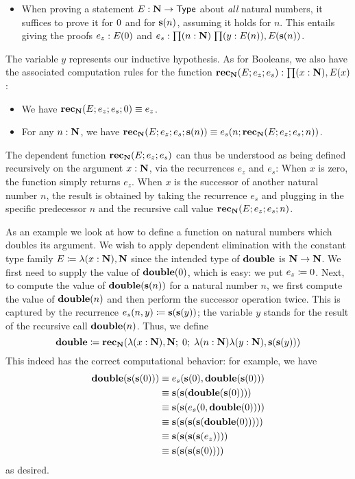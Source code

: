\begin{itemize}
\item When proving a statement $E : \mathbf{N} \to \mathsf{Type}$ about \emph{all} natural numbers, it suffices to prove it for $0$ and for $\mathbf{s}(n)$, assuming it holds
for $n$. This entails giving the proofs $e_z : E(0)$ and $e_s : \prd{n : \nat}{y : E(n)} E(\s(n))$.
\end{itemize}
The variable $y$ represents our inductive hypothesis. As for Booleans, we also have the associated computation rules for the function $\rec_\nat(E;e_z;e_s) : \prd{x:\nat} E(x)$:
\begin{itemize}
\item We have $\mathbf{rec}_\mathbf{N}(E;e_z;e_s;0) \equiv e_z$.
\item For any $n : \mathbf{N}$, we have $\mathbf{rec}_\mathbf{N}(E;e_z;e_s;\mathbf{s}(n)) \equiv e_s(n;\mathbf{rec}_\mathbf{N}(E;e_z;e_s;n))$.
\end{itemize}
The dependent function $\mathbf{rec}_\mathbf{N}(E;e_z;e_s)$ can thus be understood as being defined recursively on the argument $x : \mathbf{N}$, via the recurrences $e_z$ and $e_s$: When $x$ is zero, the function simply returns $e_z$. When $x$ is the successor of another natural number $n$, the result is obtained by taking the recurrence $e_s$ and plugging in the specific predecessor $n$ and the recursive call value $\mathbf{rec}_\mathbf{N}(E;e_z;e_s;n)$.

As an example we look at how to define a function on natural numbers which doubles its argument. We wish to apply dependent elimination with the constant type family $E \coloneqq \lambda(x : \mathbf{N}), \mathbf{N}$ since the intended type of $\mathbf{double}$ is $\mathbf{N} \to \mathbf{N}$. We first need to supply the value of $\mathbf{double}(0)$, which is easy: we put $e_z \coloneqq 0$. Next, to compute the value of $\mathbf{double}(\mathbf{s}(n))$ for a natural number $n$, we first compute the value of $\mathbf{double}(n)$ and then perform the successor operation twice. This is captured by the recurrence $e_s(n,y) \coloneqq \mathbf{s}(\mathbf{s}(y))$; the variable $y$ stands for the result of the recursive call $\mathbf{double}(n)$. Thus, we define
\[ \mathbf{double} \coloneqq \mathbf{rec}_\mathbf{N}(\lambda(x :\mathbf{N}), \mathbf{N}; \; 0; \;  \lambda(n: \mathbf{N}) \lambda (y:\mathbf{N}), \mathbf{s}(\mathbf{s}(y))) \]
This indeed has the correct computational behavior: for example, we have 
\begin{align*}
\mathbf{double}(\mathbf{s}(\mathbf{s}(0))) & \equiv e_s(\mathbf{s}(0), \mathbf{double}(\mathbf{s}(0))) \\
                 & \equiv \mathbf{s}(\mathbf{s}(\mathbf{double}(\mathbf{s}(0)))) \\
                 & \equiv \mathbf{s}(\mathbf{s}(e_s(0,\mathbf{double}(0)))) \\
                 & \equiv \mathbf{s}(\mathbf{s}(\mathbf{s}(\mathbf{s}(\mathbf{double}(0))))) \\
                 & \equiv \mathbf{s}(\mathbf{s}(\mathbf{s}(\mathbf{s}(e_z)))) \\
                 & \equiv \mathbf{s}(\mathbf{s}(\mathbf{s}(\mathbf{s}(0))))
\end{align*}
as desired.


